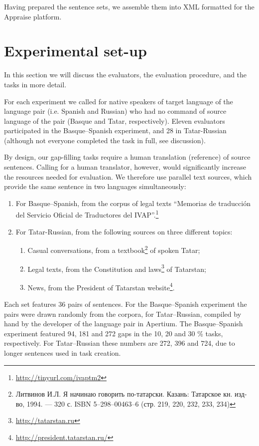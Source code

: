 \documentclass[11pt]{article}
\newcommand{\comment}[1]{}
\newcommand{\rus}[1]{\foreignlanguage{russian}{#1}}
\begin{document}
Having prepared the sentence sets, we assemble them into XML formatted for the Appraise platform.

\section{Experimental set-up}
\label{sec:setup}

In this section we will discuss the evaluators, the evaluation procedure, and the tasks in more detail.

For each experiment we called for native speakers of target language of the language pair (i.e.
Spanish and Russian) who had no command of source language of the pair (Basque
and Tatar, respectively). Eleven evaluators participated in the Basque--Spanish experiment, and 28 in Tatar-Russian (although not everyone completed the task
in full, see discussion).

By design, our gap-filling tasks require a human translation (reference) of source sentences. Calling for a human translator, however, would significantly increase the resources needed for evaluation. We therefore use parallel text sources, which provide the same sentence in two languages simultaneously:
\begin{enumerate}\itemsep 0ex
\item  For Basque--Spanish, from the corpus of legal texts ``Memorias de traducci\'on del
Servicio Oficial de Traductores del IVAP''.\footnote{\url{http://tinyurl.com/ivaptm2}} 
\item  For Tatar-Russian, from the following sources on three different topics:
  \begin{enumerate}\itemsep 0ex
    \item  Casual conversations, from a textbook\footnote{\rus{Литвинов И.Л. Я начинаю говорить по-татарски. Казань: Татарское кн. изд-во, 1994. — 320 с. ISBN 5--298--00463--6 (стр. 219, 220, 232, 233, 234)}} of spoken Tatar;
    \item  Legal texts, from the Constitution and laws\footnote{\url{http://tatarstan.ru}} of Tatarstan;
    \item  News, from the President of Tatarstan website\footnote{\url{http://president.tatarstan.ru/}}.
  \end{enumerate}
\end{enumerate}

Each set features 36 pairs of sentences. For the Basque--Spanish experiment the pairs were drawn
randomly from the corpora, for Tatar--Russian, compiled by hand by the developer of the
language pair in Apertium. The Basque--Spanish experiment featured 94, 181 and 272 gaps in the 10, 20 and 30 \% tasks, respectively. For Tatar--Russian these numbers are 272, 396 and 724, due to longer sentences used in task creation. \comment{EA to JA: Ilnar wanted to test the system on his own sentences, should I put it in the paper?}
\end{document}
